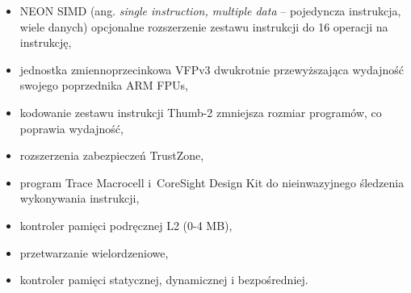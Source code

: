 \begin{itemize}
	\item NEON SIMD (ang. \textit{single instruction, multiple data} -- pojedyncza instrukcja, wiele danych) opcjonalne rozszerzenie zestawu instrukcji do 16 operacji na instrukcję,
	\item jednostka zmiennoprzecinkowa VFPv3 dwukrotnie przewyższająca wydajność swojego poprzednika ARM FPUs,
	\item kodowanie zestawu instrukcji Thumb-2 zmniejsza rozmiar programów, co poprawia wydajność,
	\item rozszerzenia zabezpieczeń TrustZone,
	\item program Trace Macrocell i~CoreSight Design Kit do nieinwazyjnego śledzenia wykonywania instrukcji,
	\item kontroler pamięci podręcznej L2 (0-4 MB),
	\item przetwarzanie wielordzeniowe,
	\item kontroler pamięci statycznej, dynamicznej i bezpośredniej.
\end{itemize}
